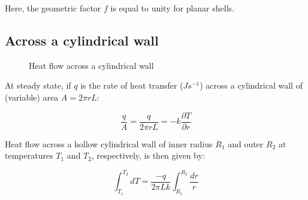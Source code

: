 Here, the geometric factor $f$ is equal to unity for planar shells.

\subsection{Across a cylindrical wall} 

\begin{figure}[h]
\begin{center}
\end{center}
\caption{Heat flow across a cylindrical wall}
\label{cylwall}
\end{figure}

At steady state, if $q$ is the rate of heat transfer ($Js^{-1}$) across a
cylindrical wall of (variable) area $A=2\pi r L$:

$$ \frac{q}{A} = \frac{q}{2\pi r L} = -k \frac{\partial T}{\partial r} $$

Heat flow across a hollow cylindrical wall of inner radius $R_1$ and outer $R_2$
at temperatures $T_1$ and $T_2$, respectively, is then given by:

$$ \int_{T_1}^{T_2}{dT} = \frac{-q}{2\pi L k} \int_{R_1}^{R_2}{\frac{dr}{r}}$$


